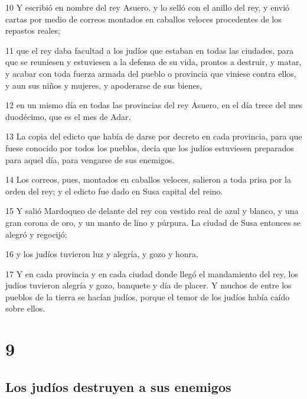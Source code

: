\par 10 Y escribió en nombre del rey Asuero, y lo selló con el anillo del rey, y envió cartas por medio de correos montados en caballos veloces procedentes de los repastos reales;
\par 11 que el rey daba facultad a los judíos que estaban en todas las ciudades, para que se reuniesen y estuviesen a la defensa de su vida, prontos a destruir, y matar, y acabar con toda fuerza armada del pueblo o provincia que viniese contra ellos, y aun sus niños y mujeres, y apoderarse de sus bienes,
\par 12 en un mismo día en todas las provincias del rey Asuero, en el día trece del mes duodécimo, que es el mes de Adar.
\par 13 La copia del edicto que había de darse por decreto en cada provincia, para que fuese conocido por todos los pueblos, decía que los judíos estuviesen preparados para aquel día, para vengarse de sus enemigos.
\par 14 Los correos, pues, montados en caballos veloces, salieron a toda prisa por la orden del rey; y el edicto fue dado en Susa capital del reino.
\par 15 Y salió Mardoqueo de delante del rey con vestido real de azul y blanco, y una gran corona de oro, y un manto de lino y púrpura. La ciudad de Susa entonces se alegró y regocijó;
\par 16 y los judíos tuvieron luz y alegría, y gozo y honra.
\par 17 Y en cada provincia y en cada ciudad donde llegó el mandamiento del rey, los judíos tuvieron alegría y gozo, banquete y día de placer. Y muchos de entre los pueblos de la tierra se hacían judíos, porque el temor de los judíos había caído sobre ellos.

\chapter{9}

\section*{Los judíos destruyen a sus enemigos}

